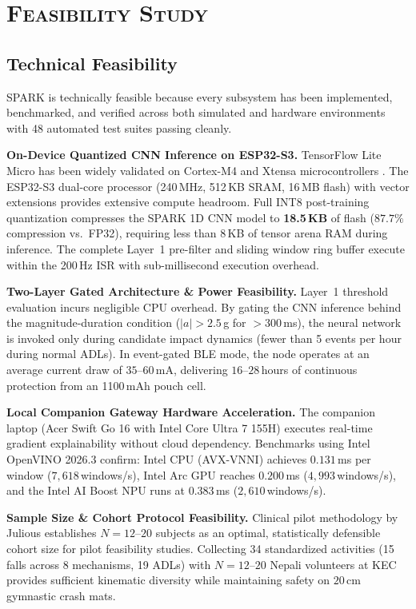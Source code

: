 
\chapter{\scshape Feasibility Study}

\section{Technical Feasibility}

SPARK is technically feasible because every subsystem has been implemented, benchmarked, and verified across both simulated and hardware environments with 48 automated test suites passing cleanly.

\textbf{On-Device Quantized CNN Inference on ESP32-S3.}
TensorFlow Lite Micro has been widely validated on Cortex-M4 and Xtensa microcontrollers \cite{david2021tensorflow}. The ESP32-S3 dual-core processor (240\,MHz, 512\,KB SRAM, 16\,MB flash) with vector extensions provides extensive compute headroom. Full INT8 post-training quantization compresses the SPARK 1D CNN model to \textbf{18.5\,KB} of flash ($87.7\%$ compression vs.\ FP32), requiring less than 8\,KB of tensor arena RAM during inference. The complete Layer~1 pre-filter and sliding window ring buffer execute within the 200\,Hz ISR with sub-millisecond execution overhead.

\textbf{Two-Layer Gated Architecture \& Power Feasibility.}
Layer~1 threshold evaluation incurs negligible CPU overhead. By gating the CNN inference behind the magnitude-duration condition ($|a| > 2.5$\,g for $>300$\,ms), the neural network is invoked only during candidate impact dynamics (fewer than 5 events per hour during normal ADLs). In event-gated BLE mode, the node operates at an average current draw of $35\text{--}60$\,mA, delivering $16\text{--}28$\,hours of continuous protection from an 1100\,mAh pouch cell.

\textbf{Local Companion Gateway Hardware Acceleration.}
The companion laptop (Acer Swift Go 16 with Intel Core Ultra 7 155H) executes real-time gradient explainability without cloud dependency. Benchmarks using Intel OpenVINO 2026.3 confirm: Intel CPU (AVX-VNNI) achieves $0.131$\,ms per window ($7{,}618$\,windows/s), Intel Arc GPU reaches $0.200$\,ms ($4{,}993$\,windows/s), and the Intel AI Boost NPU runs at $0.383$\,ms ($2{,}610$\,windows/s).

\textbf{Sample Size \& Cohort Protocol Feasibility.}
Clinical pilot methodology by Julious \cite{julious2005sample} establishes $N=12\text{--}20$ subjects as an optimal, statistically defensible cohort size for pilot feasibility studies. Collecting 34 standardized activities (15 falls across 8 mechanisms, 19 ADLs) with $N=12\text{--}20$ Nepali volunteers at KEC provides sufficient kinematic diversity while maintaining safety on $20$\,cm gymnastic crash mats.

